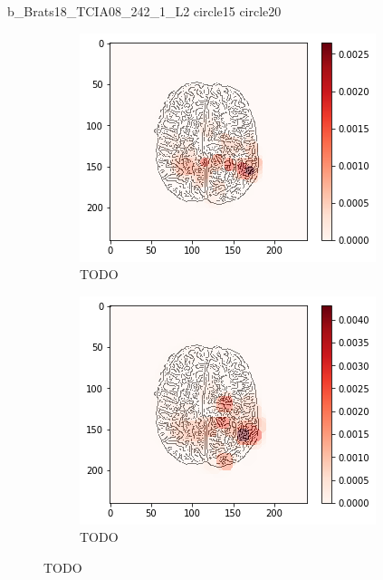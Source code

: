 b\_Brats18\_TCIA08\_242\_1\_L2
circle15
circle20


\begin{figure}[H]
    \centering
    \begin{subfigure}{.33\textwidth}
        \centering
        \includegraphics[width=\linewidth]{chapters/06_hdm/b_Brats18_TCIA08_242_1_L2/23.png}
        \caption{TODO}
    \end{subfigure}%
    \begin{subfigure}{.33\textwidth}
        \centering
        \includegraphics[width=\linewidth]{chapters/06_hdm/circle15/3.png}
        \caption{TODO}
    \end{subfigure}

\end{figure}
